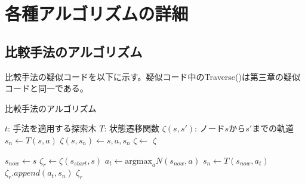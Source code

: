 \chapter{各種アルゴリズムの詳細}
\section{比較手法のアルゴリズム}
比較手法の疑似コードを以下に示す。疑似コード中のTraverse()は第三章の疑似コードと同一である。
\begin{algorithm}
    \caption{比較手法のアルゴリズム}
    \begin{algorithmic}[1]       
        \State $t$: 手法を適用する探索木
        \State $T$: 状態遷移関数
        \State $\zeta(s, s')$: ノード$s$から$s'$までの軌道
           \State $s_n \gets T(s, a)$
           \State $\zeta(s, s_n) \gets {s, a, s_n}$
           \State $\zeta \gets$ 
           \Retuen $\zeta$
        \EndFunction
        
            \State $s_{now} \gets s$
            \State $\zeta_r \gets \zeta(s_{start}, s)$
                \State $a_t \gets \textrm{argmax}_a N(s_{now}, a)$
                \State $s_n \gets T(s_{now}, a_t)$
                \State $\zeta_r.append({a_t, s_n})$
            \EndWhile
            \Return $\zeta_r$
        \EndFunction
       
        
    \end{algorithmic}
\end{algorithm}


